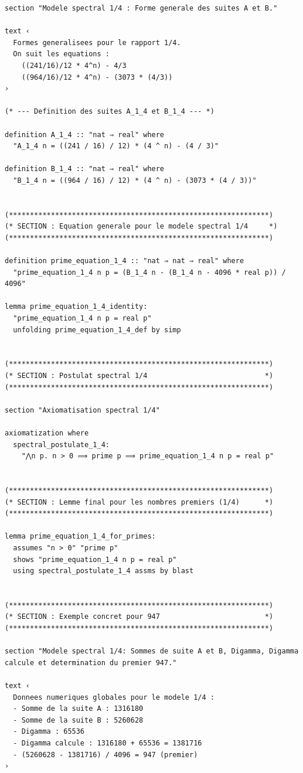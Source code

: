 \documentclass[a4paper,11pt]{article}
\begin{document}
\begin{holcode}[title={\textcolor{white}{File: methode\_spectral.thy -- Part 1/4}}]
\begin{lstlisting}
section "Modele spectral 1/4 : Forme generale des suites A et B."

text ‹
  Formes generalisees pour le rapport 1/4.
  On suit les equations :
    ((241/16)/12 * 4^n) - 4/3
    ((964/16)/12 * 4^n) - (3073 * (4/3))
›

(* --- Definition des suites A_1_4 et B_1_4 --- *)

definition A_1_4 :: "nat ⇒ real" where
  "A_1_4 n = ((241 / 16) / 12) * (4 ^ n) - (4 / 3)"

definition B_1_4 :: "nat ⇒ real" where
  "B_1_4 n = ((964 / 16) / 12) * (4 ^ n) - (3073 * (4 / 3))"


(**************************************************************)
(* SECTION : Equation generale pour le modele spectral 1/4     *)
(**************************************************************)

definition prime_equation_1_4 :: "nat ⇒ nat ⇒ real" where
  "prime_equation_1_4 n p = (B_1_4 n - (B_1_4 n - 4096 * real p)) / 4096"

lemma prime_equation_1_4_identity:
  "prime_equation_1_4 n p = real p"
  unfolding prime_equation_1_4_def by simp


(**************************************************************)
(* SECTION : Postulat spectral 1/4                            *)
(**************************************************************)

section "Axiomatisation spectral 1/4"

axiomatization where
  spectral_postulate_1_4:
    "⋀n p. n > 0 ⟹ prime p ⟹ prime_equation_1_4 n p = real p"


(**************************************************************)
(* SECTION : Lemme final pour les nombres premiers (1/4)      *)
(**************************************************************)

lemma prime_equation_1_4_for_primes:
  assumes "n > 0" "prime p"
  shows "prime_equation_1_4 n p = real p"
  using spectral_postulate_1_4 assms by blast


(**************************************************************)
(* SECTION : Exemple concret pour 947                         *)
(**************************************************************)

section "Modele spectral 1/4: Sommes de suite A et B, Digamma, Digamma calcule et determination du premier 947."

text ‹
  Donnees numeriques globales pour le modele 1/4 :
  - Somme de la suite A : 1316180
  - Somme de la suite B : 5260628
  - Digamma : 65536
  - Digamma calcule : 1316180 + 65536 = 1381716
  - (5260628 - 1381716) / 4096 = 947 (premier)
›


\end{lstlisting}
\end{holcode}
\end{document}
